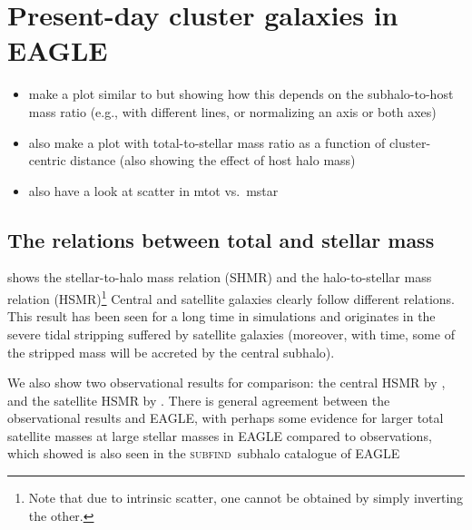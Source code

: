 \documentclass[usenatbib,fleqn]{mnras}
\newcommand{\eagle}{EAGLE}
\newcommand{\subfind}{\textsc{subfind}}
\newcommand{\zcent}{z_\mathrm{cent}}
\newcommand{\zinfall}{z_\mathrm{infall}}
\begin{document}


\section{Present-day cluster galaxies in \eagle}

\begin{itemize}
  \item make a plot similar to  but showing how this depends on the subhalo-to-host mass ratio (e.g., with different lines, or normalizing an axis or both axes)
  \item also make a plot with total-to-stellar mass ratio as a function of cluster-centric distance (also showing the effect of host halo mass)
  \item also have a look at scatter in mtot vs.\ mstar
\end{itemize}


\subsection{The relations between total and stellar mass}

 shows the stellar-to-halo mass relation (SHMR) and the halo-to-stellar mass relation (HSMR)\footnote{Note that due to intrinsic scatter, one cannot be obtained by simply inverting the other.} Central and satellite galaxies clearly follow different relations. This result has been seen for a long time in simulations and originates in the severe tidal stripping suffered by satellite galaxies (moreover, with time, some of the stripped mass will be accreted by the central subhalo).

We also show two observational results for comparison: the central HSMR by \cite{vanuitert16}, and the satellite HSMR by \cite{sifon18_meneacs}. There is general agreement between the observational results and \eagle, with perhaps some evidence for larger total satellite masses at large stellar masses in EAGLE compared to observations, which \cite{sifon18_meneacs} showed is also seen in the \subfind\ subhalo catalogue of EAGLE \citep{}
\end{document}
